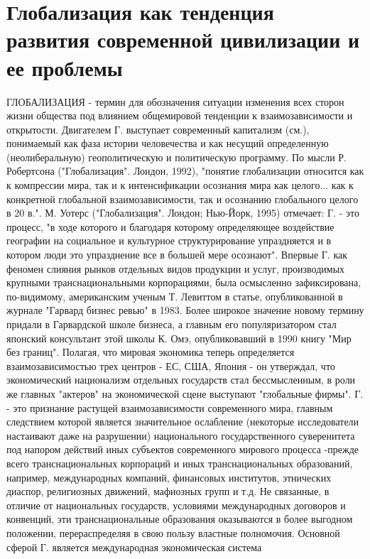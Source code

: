 \documentclass[12pt]{article}
\begin{document}
\section{Глобализация как тенденция развития современной цивилизации и ее проблемы}
ГЛОБАЛИЗАЦИЯ - термин для обозначения ситуации изменения всех сторон жизни общества под влиянием
общемировой  тенденции  к  взаимозависимости  и  открытости.  Двигателем  Г.  выступает  современный
капитализм (см.), понимаемый как фаза истории человечества и как несущий определенную (неолиберальную)
геополитическую  и  политическую  программу.  По  мысли  Р.  Робертсона  ("Глобализация".  Лондон,  1992),
"понятие глобализации относится как к компрессии мира, так и к интенсификации осознания мира как целого...
как к конкретной глобальной взаимозависимости, так и осознанию глобального целого в 20 в.". М. Уотерс
("Глобализация". Лондон; Нью-Йорк, 1995) отмечает: Г. - это процесс, "в ходе которого и благодаря которому
определяющее воздействие географии на социальное и культурное структурирование упраздняется и в котором
люди это упразднение все в большей мере осознают".
Впервые  Г.  как  феномен  слияния  рынков  отдельных  видов  продукции  и  услуг,  производимых  крупными
транснациональными корпорациями, была осмысленно зафиксирована, по-видимому, американским ученым Т.
Левиттом в статье, опубликованной в журнале "Гарвард бизнес ревью" в 1983. Более широкое значение новому
термину придали в Гарвардской школе бизнеса, а главным его популяризатором стал японский консультант этой
школы К. Омэ, опубликовавший  в  1990 книгу "Мир без границ".  Полагая,  что  мировая экономика теперь
определяется  взаимозависимостью  трех  центров  -  ЕС,  США,  Япония  -  он  утверждал,  что  экономический
национализм отдельных государств стал бессмысленным, в роли же главных "актеров" на экономической сцене
выступают "глобальные фирмы".
Г. - это признание растущей взаимозависимости современного мира, главным следствием которой является
значительное  ослабление  (некоторые  исследователи  настаивают  даже  на  разрушении)  национального
государственного  суверенитета  под  напором  действий  иных  субъектов  современного  мирового  процесса  -прежде  всего  транснациональных  корпораций  и  иных  транснациональных  образований,  например,
международных компаний, финансовых институтов, этнических диаспор, религиозных движений, мафиозных
групп и т.д. Не связанные, в отличие от национальных государств, условиями международных договоров и
конвенций, эти транснациональные образования оказываются в более выгодном положении, перераспределяя в
свою  пользу  властные  полномочия.  Основной  сферой  Г.  является  международная  экономическая  система
\end{document}
